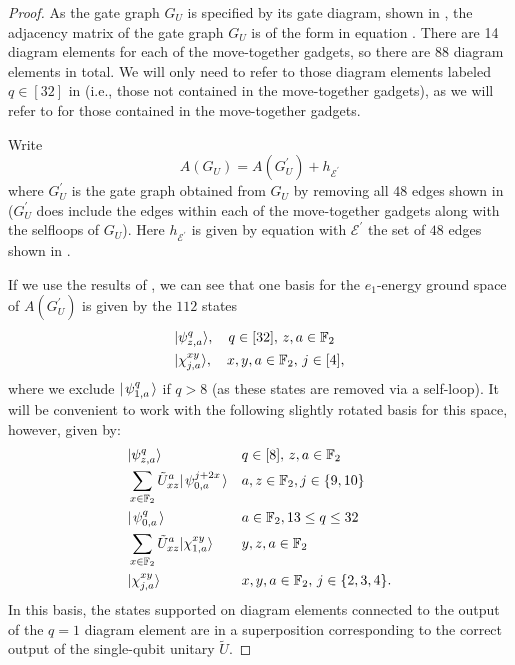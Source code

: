 \documentclass[../thesis-main/thesis-main]{subfiles}
\begin{document}
\begin{proof}
As the gate graph $G_U$ is specified by its gate diagram, shown in , the adjacency matrix of the gate graph $G_{U}$ is of the form in equation . There are 14 diagram elements for each of the move-together gadgets, so there are $88$ diagram elements in total. We will only need to refer to those diagram elements labeled $q\in [32]$ in  (i.e., those not contained in the move-together gadgets), as we will refer to  for those contained in the move-together gadgets.

Write 
\begin{equation}
  A(G_{U})=A(G_{U}^{\prime})+h_{\mathcal{E}^{\prime}}
\end{equation}
where $G_{U}^{\prime}$ is the gate graph obtained from $G_{U}$ by removing all $48$ edges shown in  ($G_U^{\prime}$ does include the edges within each of the move-together gadgets along with the selfloops of $G_{U}$). Here $h_{\mathcal{E}^{\prime}}$ is given by equation  with $\mathcal{E^{\prime}}$ the set of $48$ edges shown in .

If we use the results of , we can see that one basis for the $e_1$-energy ground space of $A(G_{U}^{\prime})$ is given by the $112$ states 
\begin{align}
  &|\psi_{z,a}^{q}\rangle,\quad q\in [32],\, z,a\in \mathbb{F}_2 \\
  &|\chi_{j,a}^{xy}\rangle,\quad x,y,a\in\mathbb{F}_2,\, j\in[4],
\end{align}
where we exclude $|\mspace{2mu} \psi_{1,a}^q \mspace{2mu} \rangle$ if $q > 8$ (as these states are removed via a self-loop). It will be convenient to work with the following slightly rotated basis for this space, however, given by:
\begin{align}
  &|\psi_{z,a}^{q}\rangle&&q\in[8],\, z,a\in \mathbb{F}_2 \\
  & \sum_{x\in\mathbb{F}_2} \tilde{U}^a_{xz}  |\mspace{2mu} \psi_{0,a}^{j + 2 x} \mspace{2mu} \rangle&& a,z\in\mathbb{F}_2, j\in \{9,10\}\\
  & |\mspace{2mu} \psi_{0,a}^q \mspace{2mu} \rangle&&  a\in \mathbb{F}_2, 13 \leq q \leq 32\\
  &\sum_{x\in \mathbb{F}_2}\tilde{U}^a_{xz}|\chi_{1,a}^{xy}\rangle&& y,z,a\in\mathbb{F}_2 \\
  &|\chi_{j,a}^{xy}\rangle&& x,y,a\in\mathbb{F}_2,\, j\in \{2,3,4\}.
\end{align}
In this basis, the states supported on diagram elements connected to the output of the $q=1$ diagram element are in a superposition corresponding to the correct output of the single-qubit unitary $\tilde U$.


\end{proof}
\end{document}

